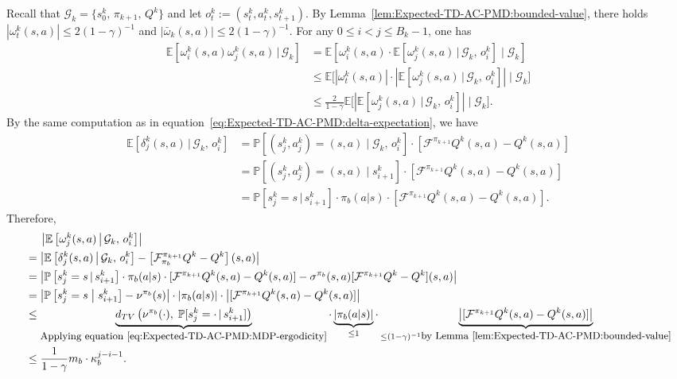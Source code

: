 \documentclass[10pt]{article}
\newcommand{\calF}{\mathcal{F}}
\newcommand{\calG}{\mathcal{G}}
\newcommand{\E}{\mathbb{E}}
\renewcommand{\P}{\mathbb{P}}
\newcommand{\ls}{\left}
\newcommand{\rs}{\right}
\theoremstyle{plain}
\theoremstyle{definition}
\begin{document}
    Recall that $\calG_k = \{ s_0^k, \, \pi_{k+1}, \, Q^k \}$ and let $o_t^k := (s_t^k, a_t^k, s_{t+1}^k)$. By Lemma~\ref{lem:Expected-TD-AC-PMD:bounded-value}, there holds $| \omega_t^k(s,a) | \leq 2(1-\gamma)^{-1}$ and $| \bar\omega_k(s,a) |\leq 2(1-\gamma)^{-1}$. For any $0 \leq i < j \leq B_k-1$, one has
    \begin{align*}
        \E\ls[ \omega_i^k(s,a) \omega_j^k(s,a) \, \big | \, \calG_k \rs] &= \E\ls[ \omega_i^k(s,a) \cdot \E \ls[ \omega_j^k(s,a) \, \big | \, \calG_k, \,o_i^k \rs] \; \big | \; \calG_k \rs] \\
        &\leq \E \Bigg[ \ls| \omega_t^k(s,a) \rs| \cdot \ls| \E\ls[ \omega_j^k(s,a) \, \big | \, \calG_k, \, o_i^k \rs] \rs| \; \Bigg | \; \calG_k  \Bigg] \\
        &\leq \frac{2}{1-\gamma} \E \Bigg[ \ls| \E\ls[ \omega_j^k(s,a) \, \big | \, \calG_k, \, o_i^k \rs] \rs| \; \Bigg | \; \calG_k  \Bigg].
    \end{align*}
    By  the same computation as in equation~\eqref{eq:Expected-TD-AC-PMD:delta-expectation}, we have
    \begin{align*}
        \E\ls[ \delta_j^k(s,a) \, \big | \, \calG_k,\, o_i^k  \rs] &= \P\ls[ (s^k_j, a^k_j)=(s,a)  \; \big | \; \calG_k, \, o_i^k \rs] \cdot [\calF^{\pi_{k+1}} Q^k(s,a) - Q^k(s,a)] \\
        &= \P\ls[ (s^k_j, a^k_j)=(s,a)  \; \big | \;  s^k_{i+1} \rs] \cdot [\calF^{\pi_{k+1}} Q^k(s,a) - Q^k(s,a)] \\
        &= \P \ls[ s_j^k = s \, | \, s_{i+1}^k \rs] \cdot \pi_b(a|s) \cdot [\calF^{\pi_{k+1}} Q^k(s,a) - Q^k(s,a)].
    \end{align*}
    Therefore,
    \begin{align*}
        &\phantom{=\,\,\,}\ls| \E\ls[ \omega_j^k(s,a) \, \big | \, \calG_k, \, o_i^k \rs] \rs| \\
        &= \ls| \E\ls[ \delta_j^k(s,a) \, \big | \, \calG_k, \, o_i^k \rs] - \ls[ \calF^{\pi_{k+1}}_{\pi_b} Q^k - Q^k \rs](s,a)  \rs| \\
        &= \ls| \P \ls[ s_j^k = s \, | \, s_{i+1}^k \rs] \cdot \pi_b(a|s) \cdot [\calF^{\pi_{k+1}} Q^k(s,a) - Q^k(s,a)] - \sigma^{\pi_b}(s,a) [\calF^{\pi_{k+1}} Q^k - Q^k](s,a) \rs| \\
        &= \ls| \P\ls[ s^k_j=s  \; \big | \; s^k_{i+1} \rs] - \nu^{\pi_b}(s) \rs | \cdot |\pi_b(a|s)| \cdot \ls | [\calF^{\pi_{k+1}} Q^k(s,a) - Q^k(s,a)] \rs| \\
        &\leq \underbrace{d_{TV}\ls( \nu^{\pi_b}(\cdot) , \; \P[s_j^k=\cdot \, | \, s^k_{i+1}]\rs)}_{\mbox{\small Applying equation~\eqref{eq:Expected-TD-AC-PMD:MDP-ergodicity}}} \cdot \underbrace{|\pi_b(a|s)|}_{\leq 1} \cdot \underbrace{\ls | [\calF^{\pi_{k+1}} Q^k(s,a) - Q^k(s,a)] \rs|}_{\leq (1-\gamma)^{-1} \mbox{\small by Lemma~\ref{lem:Expected-TD-AC-PMD:bounded-value}}}\\
        &\leq \frac{1}{1-\gamma} m_b \cdot \kappa_b^{j-i-1}.
    \end{align*}
\end{document}
